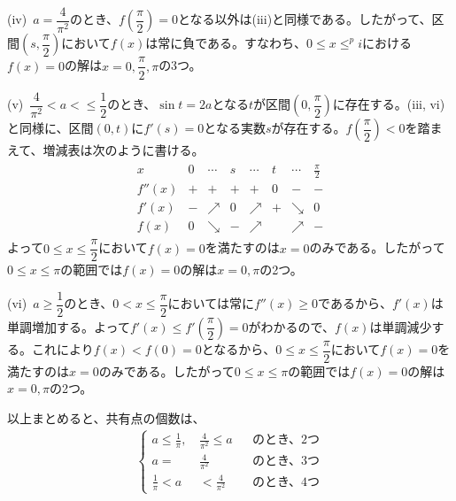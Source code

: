(iv)~$a=\dfrac{4}{\pi^2}$のとき、$f\left(\dfrac{\pi}{2}\right)=0$となる以外は(iii)と同様である。したがって、区間$\left(s, \dfrac{\pi}{2}\right)$において$f(x)$は常に負である。すなわち、$0\le x\le ^pi$における$f(x)=0$の解は$x=0,\dfrac{\pi}{2}, \pi$の3つ。

(v)~$\dfrac{4}{\pi^2}<a<\le\dfrac{1}{2}$のとき、$\sin t=2a$となる$t$が区間$\left(0, \dfrac{\pi}{2} \right)$に存在する。(iii, vi)と同様に、区間$(0, t)$に$f'(s)=0$となる実数$s$が存在する。$f\left(\dfrac{\pi}{2}\right)<0$を踏まえて、増減表は次のように書ける。
\begin{align*}
 \begin{array}{c|c|c|c|c|c|c|c}
  x & 0 & \cdots & s & \cdots & t & \cdots & \frac{\pi}{2} \\ \hline
  f''(x) & + & + & + & + & 0 & - & - \\ \hline
  f'(x) & - & \nearrow & 0 & \nearrow &  + & \searrow & 0 \\ \hline
  f(x) & 0 & \searrow & - & \nearrow & & \nearrow & -
 \end{array}
\end{align*}
よって$0\le x\le \dfrac{\pi}{2}$において$f(x)=0$を満たすのは$x=0$のみである。したがって$0\le x\le \pi$の範囲では$f(x)=0$の解は$x=0, \pi$の2つ。

(vi)~$a\ge\dfrac{1}{2}$のとき、$0< x\le \dfrac{\pi}{2}$においては常に$f''(x)\ge 0$であるから、$f'(x)$は単調増加する。よって$f'(x)\le f'\left(\dfrac{\pi}{2}\right)=0$がわかるので、$f(x)$は単調減少する。これにより$f(x)<f(0)=0$となるから、$0\le x\le \dfrac{\pi}{2}$において$f(x)=0$を満たすのは$x=0$のみである。したがって$0\le x\le \pi$の範囲では$f(x)=0$の解は$x=0, \pi$の2つ。

以上まとめると、共有点の個数は、
\begin{align*}
 \left\{
 \begin{aligned}
  a\le \frac{1}{\pi},\,& \frac{4}{\pi^2}\le a & &\text{のとき、2つ} \\
  a=&\frac{4}{\pi^2} & &\text{のとき、3つ} \\
  \frac{1}{\pi}<a&<\frac{4}{\pi^2} & &\text{のとき、4つ}
 \end{aligned}
 \right.
\end{align*}
